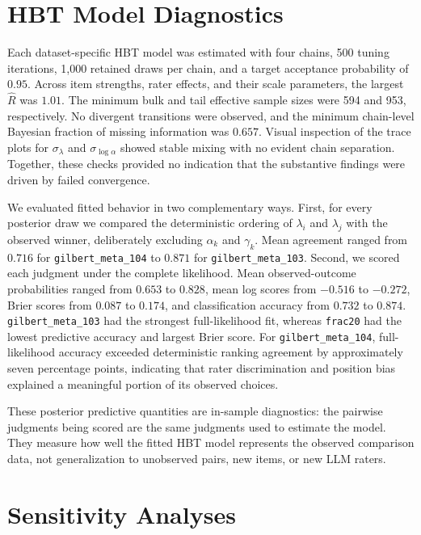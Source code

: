 \documentclass[11pt]{article}
\begin{document}
\section{HBT Model Diagnostics}
\label{app:hbt_diagnostics}

Each dataset-specific HBT model was estimated with four chains, 500 tuning iterations, 1,000 retained draws per chain, and a target acceptance probability of $0.95$. Across item strengths, rater effects, and their scale parameters, the largest $\hat{R}$ was $1.01$. The minimum bulk and tail effective sample sizes were 594 and 953, respectively. No divergent transitions were observed, and the minimum chain-level Bayesian fraction of missing information was $0.657$. Visual inspection of the trace plots for $\sigma_{\lambda}$ and $\sigma_{\log\alpha}$ showed stable mixing with no evident chain separation. Together, these checks provided no indication that the substantive findings were driven by failed convergence.

We evaluated fitted behavior in two complementary ways. First, for every posterior draw we compared the deterministic ordering of $\lambda_i$ and $\lambda_j$ with the observed winner, deliberately excluding $\alpha_k$ and $\gamma_k$. Mean agreement ranged from $0.716$ for \texttt{gilbert\_meta\_104} to $0.871$ for \texttt{gilbert\_meta\_103}. Second, we scored each judgment under the complete likelihood. Mean observed-outcome probabilities ranged from $0.653$ to $0.828$, mean log scores from $-0.516$ to $-0.272$, Brier scores from $0.087$ to $0.174$, and classification accuracy from $0.732$ to $0.874$. \texttt{gilbert\_meta\_103} had the strongest full-likelihood fit, whereas \texttt{frac20} had the lowest predictive accuracy and largest Brier score. For \texttt{gilbert\_meta\_104}, full-likelihood accuracy exceeded deterministic ranking agreement by approximately seven percentage points, indicating that rater discrimination and position bias explained a meaningful portion of its observed choices.

These posterior predictive quantities are in-sample diagnostics: the pairwise judgments being scored are the same judgments used to estimate the model. They measure how well the fitted HBT model represents the observed comparison data, not generalization to unobserved pairs, new items, or new LLM raters.

\section{Sensitivity Analyses}
\label{app:sensitivity}
\end{document}
